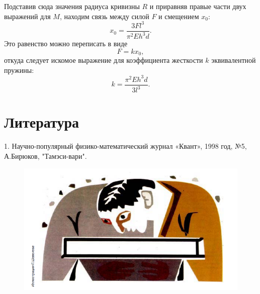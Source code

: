 \documentclass[a4paper,12pt]{article} %
\begin{document}
Подставив сюда значения радиуса кривизны $R$ и приравняв правые части двух выражений для $M$, находим связь между силой $F$ и смещением $x_0$: $$x_0 = \dfrac{3Fl^3}{\pi^2Eh^3d}.$$ Это равенство можно переписать в виде $$F = kx_0,$$ откуда следует искомое выражение для коэффициента жесткости $k$ эквивалентной пружины: $$k = \dfrac{\pi^2Eh^3d}{3l^3}.$$

\section*{Литература}
1. Научно-популярный физико-математический журнал «Квант», 1998 год, №5, А.Бирюков, "Тамэси-вари".
\begin{figure}[h]
\begin{center}
\includegraphics[width=15cm]{pictures/кек.PNG}
\label{fig:image}
\end{center}
\end{figure}
\end{document}
